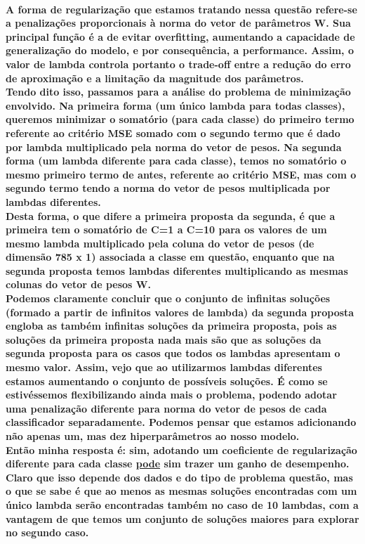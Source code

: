 \documentclass[a4paper]{article}    %
\begin{document}
\paragraph{A forma de regularização que estamos tratando nessa questão refere-se a penalizações proporcionais à norma do vetor de parâmetros W. Sua principal função é a de evitar overfitting, aumentando a capacidade de generalização do modelo, e por consequência, a performance. Assim, o valor de lambda controla portanto o trade-off entre a redução do erro de aproximação e a limitação da magnitude dos parâmetros.
\vspace{0.2cm}\\
Tendo dito isso, passamos para a análise do problema de minimização envolvido. Na primeira forma (um único lambda para todas classes), queremos minimizar o somatório (para cada classe) do primeiro termo referente ao critério MSE somado com o segundo termo que é dado por lambda multiplicado pela norma do vetor de pesos. Na segunda forma (um lambda diferente para cada classe), temos no somatório o mesmo primeiro termo de antes, referente ao critério MSE, mas com o segundo termo tendo a norma do vetor de pesos multiplicada por lambdas diferentes.
\vspace{0.2cm}\\
Desta forma, o que difere a primeira proposta da segunda, é que a primeira tem o somatório de C=1 a C=10 para os valores de um mesmo lambda multiplicado pela coluna do vetor de pesos (de dimensão 785 x 1) associada a classe em questão, enquanto que na segunda proposta temos lambdas diferentes multiplicando as mesmas colunas do vetor de pesos W.
\vspace{0.2cm}\\
Podemos claramente concluir que o conjunto de infinitas soluções (formado a partir de infinitos valores de lambda) da segunda proposta engloba as também infinitas soluções da primeira proposta, pois as soluções da primeira proposta nada mais são que as soluções da segunda proposta para os casos que todos os lambdas apresentam o mesmo valor. Assim, vejo que ao utilizarmos lambdas diferentes estamos aumentando o conjunto de possíveis soluções. É como se estivéssemos flexibilizando ainda mais o problema, podendo adotar uma penalização diferente para norma do vetor de pesos de cada classificador separadamente. Podemos pensar que estamos adicionando não apenas um, mas dez hiperparâmetros ao nosso modelo.
\vspace{0.2cm}\\
Então minha resposta é: sim, adotando um coeficiente de regularização diferente para cada classe \underline{pode} sim trazer um ganho de desempenho. Claro que isso depende dos dados e do tipo de problema questão, mas o que se sabe é que ao menos as mesmas soluções encontradas com um único lambda serão encontradas também no caso de 10 lambdas, com a vantagem de que temos um conjunto de soluções maiores para explorar no segundo caso.
}

\end{document}

